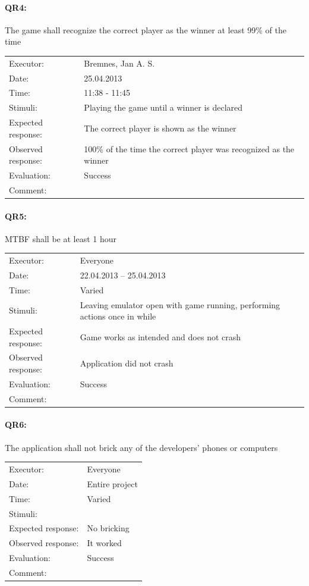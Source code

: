 \documentclass[12pt, a4paper]{article}
\begin{document}
\paragraph{QR4:} The game shall recognize the correct player as the winner at
least 99\% of the time \\
\begin{tabular}{  p{}  p{} }
    Executor: & Bremnes, Jan A. S. \\
    Date: & 25.04.2013 \\
    Time: & 11:38 - 11:45 \\
    Stimuli: & Playing the game until a winner is declared \\
    Expected response: & The correct player is shown as the winner \\
    Observed response: & 100\% of the time the correct player was recognized as the winner \\
    Evaluation: & Success \\
    Comment: &  \\
\end{tabular}

\paragraph{QR5:} MTBF shall be at least 1 hour\\
\begin{tabular}{  p{}  p{} }
    Executor: & Everyone \\
    Date: & 22.04.2013 – 25.04.2013 \\
    Time: & Varied \\
    Stimuli: & Leaving emulator open with game running, performing actions once in  while \\
    Expected response: & Game works as intended and does not crash \\
    Observed response: & Application did not crash \\
    Evaluation: & Success \\
    Comment: &  \\
\end{tabular}

\paragraph{QR6:} The application shall not brick any of the developers' phones
or computers \\
\begin{tabular}{  p{}  p{} }
    Executor: & Everyone \\
    Date: & Entire project \\
    Time: & Varied \\
    Stimuli: &  \\
    Expected response: & No bricking \\
    Observed response: & It worked \\
    Evaluation: & Success \\
    Comment: &  \\
\end{tabular}
\end{document}

